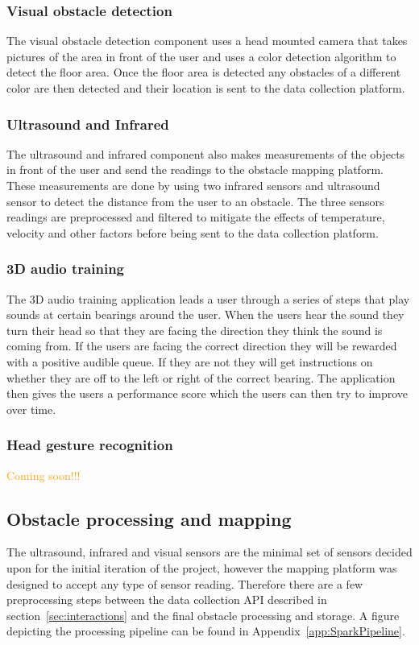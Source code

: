 \documentclass[prodmode,acmtosem]{acmsmall} %
\begin{document}
\subsubsection{Visual obstacle detection}
The visual obstacle detection component uses a head mounted camera that takes pictures of the area in front of the user and uses a color detection algorithm to detect the floor area. Once the floor area is detected any obstacles of a different color are then detected and their location is sent to the data collection platform.

\subsubsection{Ultrasound and Infrared}
The ultrasound and infrared component also makes measurements of the objects in front of the user and send the readings to the obstacle mapping platform.
These measurements are done by using two infrared sensors and ultrasound sensor to detect the distance from the user to an obstacle. The three sensors readings are preprocessed and filtered to mitigate the effects of temperature, velocity and other factors before being sent to the data collection platform. 

\subsubsection{3D audio training}
The 3D audio training application leads a user through a series of steps that play sounds at certain bearings around the user. When the users hear the sound they turn their head so that they are facing the direction they think the sound is coming from. If the users are facing the correct direction they will be rewarded with a positive audible queue. If they are not they will get instructions on whether they are off to the left or right of the correct bearing. The application then gives the users a performance score which the users can then try to improve over time.

\subsubsection{Head gesture recognition}
\textcolor{orange}{Coming soon!!!}

\subsection{Obstacle processing and mapping}
The ultrasound, infrared and visual sensors are the minimal set of sensors decided upon for the initial iteration of the project, however the mapping platform was designed to accept any type of sensor reading. Therefore there are a few preprocessing steps between the data collection API described in section~\ref{sec:interactions} and the final obstacle processing and storage. A figure depicting the processing pipeline can be found in Appendix~\ref{app:SparkPipeline}.
\end{document}
